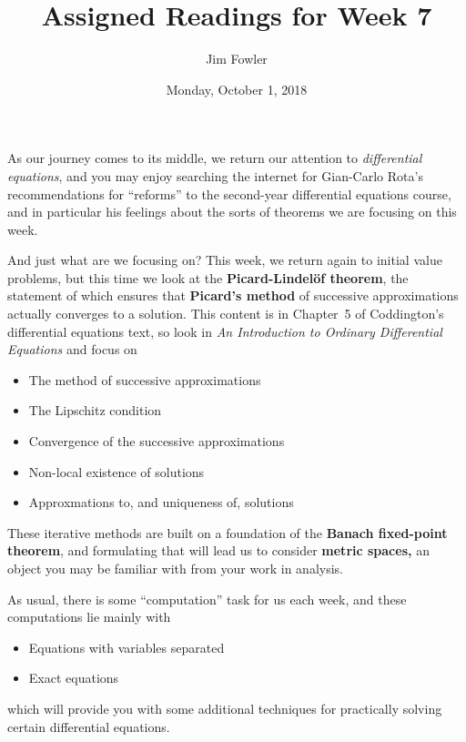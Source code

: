 \documentclass[11pt]{homework}
\author{Jim Fowler}
\title{Assigned Readings for Week 7}
\date{Monday, October 1, 2018}
\begin{document}
\maketitle

As our journey comes to its middle, we return our attention to
\textit{differential equations}, and you may enjoy searching the
internet for Gian-Carlo Rota's recommendations for ``reforms'' to the
second-year differential equations course, and in particular his
feelings about the sorts of theorems we are focusing on this week.

And just what are we focusing on?  This week, we return again to
initial value problems, but this time we look at the
\textbf{Picard-Lindel\"of theorem}, the statement of which ensures
that \textbf{Picard's method} of successive approximations actually
converges to a solution.  This content is in Chapter~5 of Coddington's
differential equations text, so look in \textit{An Introduction to
  Ordinary Differential Equations} and focus on
\begin{itemize}
\item {} The method of successive approximations
\item {} The Lipschitz condition
\item {} Convergence of the successive approximations
\item {} Non-local existence of solutions
\item {} Approxmations to, and uniqueness of, solutions
\end{itemize}
These iterative methods are built on a foundation of the
\textbf{Banach fixed-point theorem}, and formulating that will lead us
to consider \textbf{metric spaces,} an object you may be familiar with
from your work in analysis.

As usual, there is some ``computation'' task for us each week, and these computations lie mainly with
\begin{itemize}
  \item {} Equations with variables separated
  \item {} Exact equations
\end{itemize}
which will provide you with some additional techniques for practically
solving certain differential equations.
\end{document}
